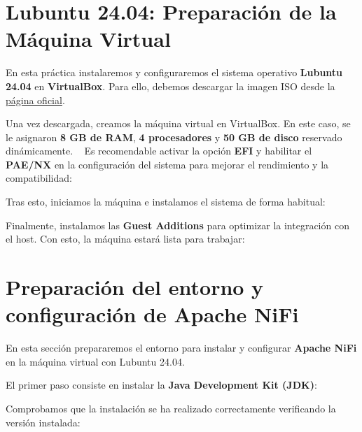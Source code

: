 \documentclass{../../miPlantilla}
\begin{document}
\maketitle

\section{Lubuntu 24.04: Preparación de la Máquina Virtual}
En esta práctica instalaremos y configuraremos el sistema operativo \textbf{Lubuntu 24.04} en \textbf{VirtualBox}.
Para ello, debemos descargar la imagen ISO desde la \href{https://cdimage.ubuntu.com/lubuntu/releases/noble/release/lubuntu-24.04.3-desktop-amd64.iso}{página oficial}.  

Una vez descargada, creamos la máquina virtual en VirtualBox. En este caso, se le asignaron \textbf{8 GB de RAM}, \textbf{4 procesadores} y \textbf{50 GB de disco} reservado dinámicamente.  
Es recomendable activar la opción \textbf{EFI} y habilitar el \textbf{PAE/NX} en la configuración del sistema para mejorar el rendimiento y la compatibilidad:


Tras esto, iniciamos la máquina e instalamos el sistema de forma habitual:


Finalmente, instalamos las \textbf{Guest Additions} para optimizar la integración con el host. Con esto, la máquina estará lista para trabajar:


\newpage

\section{Preparación del entorno y configuración de Apache NiFi}
En esta sección prepararemos el entorno para instalar y configurar \textbf{Apache NiFi} en la máquina virtual con Lubuntu 24.04.  

El primer paso consiste en instalar la \textbf{Java Development Kit (JDK)}:


Comprobamos que la instalación se ha realizado correctamente verificando la versión instalada:

\end{document}
